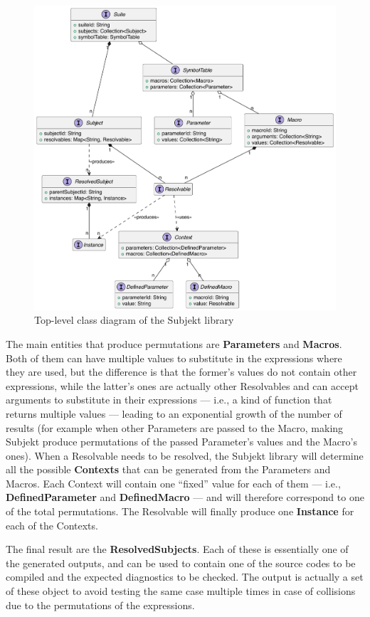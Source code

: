 \documentclass[12pt,a4paper,openright,twoside]{book}
\begin{document}
\begin{figure}
  \centering
  \includegraphics[width=.8\linewidth]{figures/subjekt-structure.pdf}
  \caption{Top-level class diagram of the Subjekt library}
  \label{fig:subjekt-structure}
\end{figure}

The main entities that produce permutations are \textbf{Parameters} and
\textbf{Macros}. Both of them can have multiple values to substitute in the
expressions where they are used, but the difference is that the former's values
do not contain other expressions, while the latter's ones are actually other
Resolvables and can accept arguments to substitute in their expressions ---
i.e., a kind of function that returns multiple values --- leading to an
exponential growth of the number of results (for example when other Parameters
are passed to the Macro, making Subjekt produce permutations of the passed
Parameter's values and the Macro's ones).
%
When a Resolvable needs to be resolved, the Subjekt library will determine all
the possible \textbf{Contexts} that can be generated from the Parameters and
Macros. Each Context will contain one ``fixed'' value for each of them --- i.e.,
\textbf{DefinedParameter} and \textbf{DefinedMacro} --- and will therefore 
correspond to one of the total permutations.
%
The Resolvable will finally produce one \textbf{Instance} for each of the
Contexts.

The final result are the \textbf{ResolvedSubjects}. Each of these is
essentially one of the generated outputs, and can be used to contain one of the
source codes to be compiled and the expected diagnostics to be checked.
%
The output is actually a set of these object to avoid testing the same case
multiple times in case of collisions due to the permutations of the expressions.
\end{document}

